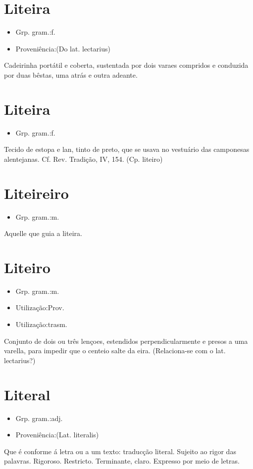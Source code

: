 \section{Liteira}
\begin{itemize}
\item {Grp. gram.:f.}
\end{itemize}
\begin{itemize}
\item {Proveniência:(Do lat. \textunderscore lectarius\textunderscore )}
\end{itemize}
Cadeirinha portátil e coberta, sustentada por dois varaes compridos e conduzida por duas bêstas, uma atrás e outra adeante.
\section{Liteira}
\begin{itemize}
\item {Grp. gram.:f.}
\end{itemize}
Tecido de estopa e lan, tinto de preto, que se usava no vestuário das camponesas alentejanas. Cf. Rev. \textunderscore Tradição\textunderscore , IV, 154.
(Cp. \textunderscore liteiro\textunderscore )
\section{Liteireiro}
\begin{itemize}
\item {Grp. gram.:m.}
\end{itemize}
Aquelle que guia a liteira.
\section{Liteiro}
\begin{itemize}
\item {Grp. gram.:m.}
\end{itemize}
\begin{itemize}
\item {Utilização:Prov.}
\end{itemize}
\begin{itemize}
\item {Utilização:trasm.}
\end{itemize}
Conjunto de dois ou três lençoes, estendidos perpendicularmente e presos a uma varella, para impedir que o centeio salte da eira.
(Relaciona-se com o lat. \textunderscore lectarius\textunderscore ?)
\section{Literal}
\begin{itemize}
\item {Grp. gram.:adj.}
\end{itemize}
\begin{itemize}
\item {Proveniência:(Lat. \textunderscore literalis\textunderscore )}
\end{itemize}
Que é conforme á letra ou a um texto: \textunderscore traducção literal\textunderscore .
Sujeito ao rigor das palavras.
Rigoroso.
Restricto.
Terminante, claro.
Expresso por meio de letras.
